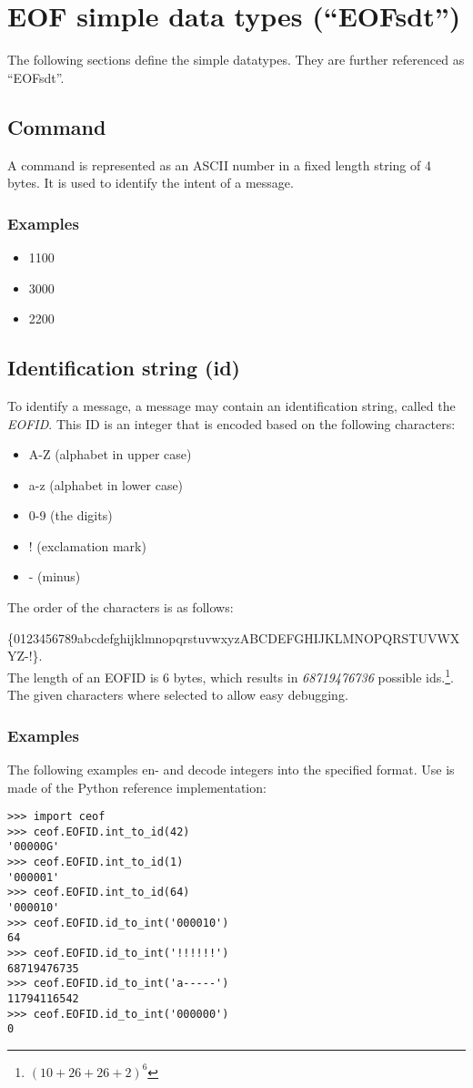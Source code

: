 \section{EOF simple data types ("`EOFsdt"')}
The following sections define the simple datatypes.
They are further referenced as "`EOFsdt"'.
\subsection{Command}
A command is represented as an ASCII number in a fixed length string of
4 bytes. It is used to identify the intent of a message.
\subsubsection{Examples}
\begin{itemize}
\item 1100
\item 3000
\item 2200
\end{itemize}
\subsection{Identification string (id)}
\label{eofid}
To identify a message, a message may contain an identification string,
called the \textit{EOFID}.
This ID is an integer that is encoded based on the following characters:
\begin{itemize}
\item A-Z (alphabet in upper case)
\item a-z (alphabet in lower case)
\item 0-9 (the digits)
\item ! (exclamation mark)
\item - (minus)
\end{itemize}
The order of the characters is as follows:

\small{\{0123456789abcdefghijklmnopqrstuvwxyzABCDEFGHIJKLMNOPQRSTUVWXYZ-!\}}.\\
The length of an EOFID is 6 bytes, which results in
\emph{68719476736} possible ids.\footnote{$(10+26+26+2)^6$}.
The given characters where selected to allow easy debugging.
\subsubsection{Examples}
The following examples en- and decode integers into the specified format.
Use is made of the Python reference implementation:
\begin{verbatim}
>>> import ceof
>>> ceof.EOFID.int_to_id(42)
'00000G'
>>> ceof.EOFID.int_to_id(1)
'000001'
>>> ceof.EOFID.int_to_id(64)
'000010'
>>> ceof.EOFID.id_to_int('000010')
64
>>> ceof.EOFID.id_to_int('!!!!!!')
68719476735
>>> ceof.EOFID.id_to_int('a-----')
11794116542
>>> ceof.EOFID.id_to_int('000000')
0
\end{verbatim}
